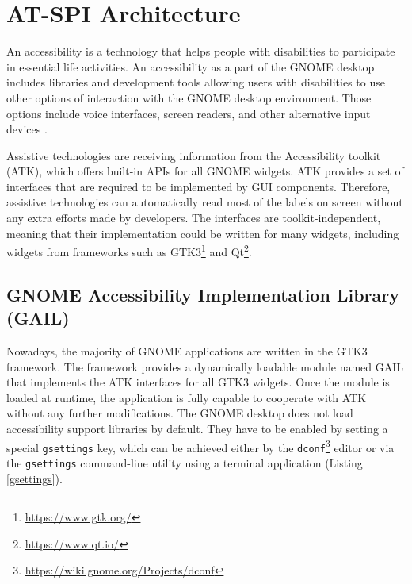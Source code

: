 
\chapter{AT-SPI Architecture}\label{chapter_2}
An accessibility is a technology that helps people with disabilities to participate in essential life activities. An accessibility as a part of the GNOME desktop includes libraries and development tools allowing users with disabilities to use other options of interaction with the GNOME desktop environment. Those options include voice interfaces, screen readers, and other alternative input devices \cite{gnomeADG}.

Assistive technologies are receiving information from the Accessibility toolkit (ATK), which offers built-in APIs for all GNOME widgets. ATK provides a set of interfaces that are required to be implemented by GUI components. Therefore, assistive technologies can automatically read most of the labels on screen without any extra efforts made by developers. The interfaces are toolkit-independent, meaning that their implementation could be written for many widgets, including widgets from frameworks such as GTK3\footnote{\url{https://www.gtk.org/}} and Qt\footnote{\url{https://www.qt.io/}}.

\section{GNOME Accessibility Implementation Library (GAIL)}
Nowadays, the majority of GNOME applications are written in the GTK3 framework. The framework provides a dynamically loadable module named GAIL that implements the ATK interfaces for all GTK3 widgets. Once the module is loaded at runtime, the application is fully capable to cooperate with ATK without any further modifications.
The GNOME desktop does not load accessibility support libraries by default. They have to be enabled by setting a special \texttt{gsettings} key, which can be achieved either by the \texttt{dconf}\footnote{\url{https://wiki.gnome.org/Projects/dconf}} editor or via the \texttt{gsettings} command-line utility using a terminal application (Listing \ref{gsettings}).

